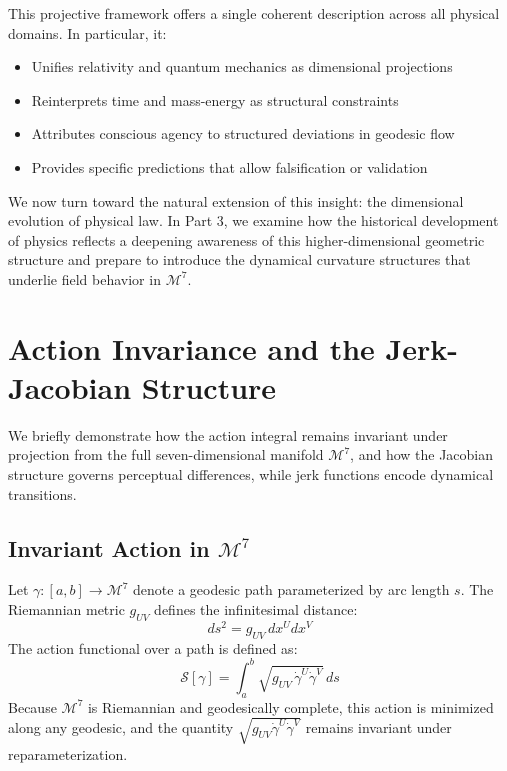 \documentclass{article}
\begin{document}
This projective framework offers a single coherent description across all physical domains. In particular, it:

\begin{itemize}
    \item Unifies relativity and quantum mechanics as dimensional projections
    \item Reinterprets time and mass-energy as structural constraints
    \item Attributes conscious agency to structured deviations in geodesic flow
    \item Provides specific predictions that allow falsification or validation
\end{itemize}

We now turn toward the natural extension of this insight: the dimensional evolution of physical law. In Part 3, we examine how the historical development of physics reflects a deepening awareness of this higher-dimensional geometric structure and prepare to introduce the dynamical curvature structures that underlie field behavior in \( \mathcal{M}^7 \).




\appendix

\section{Action Invariance and the Jerk-Jacobian Structure}

We briefly demonstrate how the action integral remains invariant under projection from the full seven-dimensional manifold \( \mathcal{M}^7 \), and how the Jacobian structure governs perceptual differences, while jerk functions encode dynamical transitions.

\subsection{Invariant Action in \( \mathcal{M}^7 \)}

Let \( \gamma : [a, b] \to \mathcal{M}^7 \) denote a geodesic path parameterized by arc length \( s \). The Riemannian metric \( g_{UV} \) defines the infinitesimal distance:
\[
    ds^2 = g_{UV} \, dx^U dx^V
\]
The action functional over a path is defined as:
\[
    \mathcal{S}[\gamma] = \int_a^b \sqrt{g_{UV} \, \dot{\gamma}^U \dot{\gamma}^V} \, ds
\]
Because \( \mathcal{M}^7 \) is Riemannian and geodesically complete, this action is minimized along any geodesic, and the quantity \( \sqrt{g_{UV} \dot{\gamma}^U \dot{\gamma}^V} \) remains invariant under reparameterization.
\end{document}
